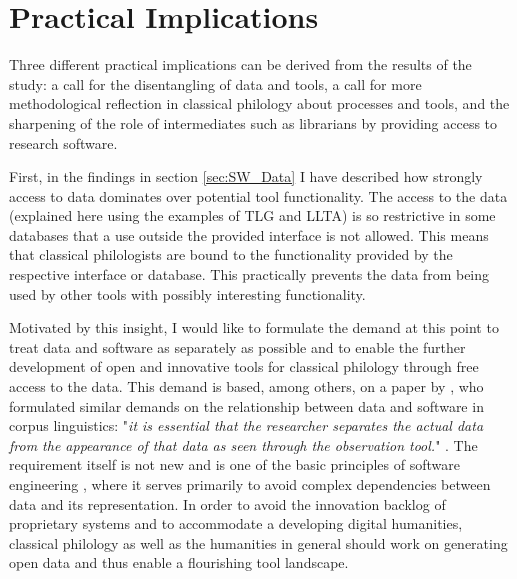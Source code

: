 \documentclass[12pt, a4paper, titlepage, oneside, abstract=true, toc=listof, toc=bibliography, BCOR=1cm]{scrreprt}
\begin{document}
{\section{Practical Implications}
\label{sec:Disc_PI}
Three different practical implications can be derived from the results of the study: a call for the disentangling of data and tools, a call for more methodological reflection in classical philology about processes and tools, and the sharpening of the role of intermediates such as librarians by providing access to research software.
 
First, in the findings in section \ref{sec:SW_Data} I have described how strongly access to data dominates over potential tool functionality. The access to the data (explained here using the examples of TLG and LLTA) is so restrictive in some databases that a use outside the provided interface is not allowed. This means that classical philologists are bound to the functionality provided by the respective interface or database. This practically prevents the data from being used by other tools with possibly interesting functionality. 

Motivated by this insight, I would like to formulate the demand at this point to treat data and software as separately as possible and to enable the further development of open and innovative tools for classical philology through free access to the data. This demand is based, among others, on a paper by \citet{Anthony2013}, who formulated similar demands on the relationship between data and software in corpus linguistics: "\textit{it is essential that the researcher separates the actual data from the appearance of that data as seen through the observation tool.}" \citep[p. 143]{Anthony2013}. The requirement itself is not new and is one of the basic principles of software engineering \citep{Sommerville2007}, where it serves primarily to avoid complex dependencies between data and its representation. In order to avoid the innovation backlog of proprietary systems and to accommodate a developing digital humanities, classical philology as well as the humanities in general should work on generating open data and thus enable a flourishing tool landscape.

}
\end{document}
